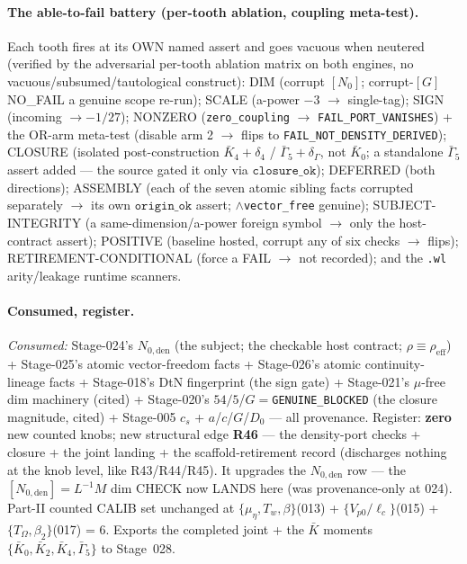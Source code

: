 \paragraph{The able-to-fail battery (per-tooth ablation, coupling meta-test).}
Each tooth fires at its OWN named assert and goes vacuous when neutered (verified by the adversarial per-tooth ablation
matrix on both engines, no vacuous/subsumed/tautological construct): DIM (corrupt \([N_0]\); corrupt-\([G]\) NO\_FAIL a
genuine scope re-run); SCALE (a-power \(-3\) \(\to\) single-tag); SIGN (incoming \(\to -1/27\)); NONZERO (\texttt{zero\_coupling}
\(\to\) \texttt{FAIL\_PORT\_VANISHES}) + the OR-arm meta-test (disable arm 2 \(\to\) flips to
\texttt{FAIL\_NOT\_DENSITY\_DERIVED}); CLOSURE (isolated post-construction \(\bar K_4+\delta_4\) / \(\bar\Gamma_5+\delta_\Gamma\),
not \(\bar K_0\); a standalone \(\bar\Gamma_5\) assert added --- the source gated it only via \(\texttt{closure\_ok}\));
DEFERRED (both directions); ASSEMBLY (each of the seven atomic sibling facts corrupted separately \(\to\) its own
\(\texttt{origin\_ok}\) assert; \(\wedge\)\texttt{vector\_free} genuine); SUBJECT-INTEGRITY (a same-dimension/a-power foreign
symbol \(\to\) only the host-contract assert); POSITIVE (baseline hosted, corrupt any of six checks \(\to\) flips);
RETIREMENT-CONDITIONAL (force a FAIL \(\to\) not recorded); and the \texttt{.wl} arity/leakage runtime scanners.

\paragraph{Consumed, register.}
\emph{Consumed:} Stage-024's \(N_{0,\mathrm{den}}\) (the subject; the checkable host contract; \(\rho\equiv\rho_{\mathrm{eff}}\))
+ Stage-025's atomic vector-freedom facts + Stage-026's atomic continuity-lineage facts + Stage-018's DtN fingerprint (the
sign gate) + Stage-021's \(\mu\)-free dim machinery (cited) + Stage-020's \(54/5\)/\(G=\)\texttt{GENUINE\_BLOCKED} (the
closure magnitude, cited) + Stage-005 \(c_s\) + \(a\)/\(c\)/\(G\)/\(D_0\) --- all provenance. Register: \textbf{zero} new
counted knobs; new structural edge \textbf{R46} --- the density-port checks + closure + the joint landing + the
scaffold-retirement record (discharges nothing at the knob level, like R43/R44/R45). It upgrades the \(N_{0,\mathrm{den}}\)
row --- the \([N_{0,\mathrm{den}}]=L^{-1}M\) dim CHECK now LANDS here (was provenance-only at 024). Part-II counted CALIB set
unchanged at \(\{\mu_\eta,T_w,\beta\}\)(013) + \(\{V_{p0}/\ell_c\}\)(015) + \(\{T_\Omega,\beta_2\}\)(017) = 6. Exports the
completed joint + the \(\bar K\) moments \(\{\bar K_0,\bar K_2,\bar K_4,\bar\Gamma_5\}\) to Stage~028.

